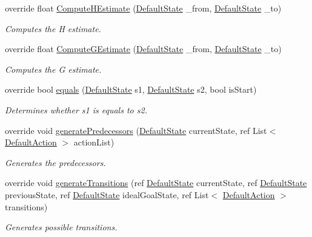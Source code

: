 \begin{DoxyCompactItemize}
\item 
override float \hyperlink{class_a_r_astar_domain_a94b2a2fb1766938d4da597ebf3fa16fd}{Compute\-H\-Estimate} (\hyperlink{class_default_state}{Default\-State} \-\_\-from, \hyperlink{class_default_state}{Default\-State} \-\_\-to)
\begin{DoxyCompactList}\small\item\em Computes the H estimate. \end{DoxyCompactList}\item 
override float \hyperlink{class_a_r_astar_domain_ae5d72a77811f6c7ec9eb48e2c4d895f0}{Compute\-G\-Estimate} (\hyperlink{class_default_state}{Default\-State} \-\_\-from, \hyperlink{class_default_state}{Default\-State} \-\_\-to)
\begin{DoxyCompactList}\small\item\em Computes the G estimate. \end{DoxyCompactList}\item 
override bool \hyperlink{class_a_r_astar_domain_a3da7327f8e5bf0594ba9ddb5c183475c}{equals} (\hyperlink{class_default_state}{Default\-State} s1, \hyperlink{class_default_state}{Default\-State} s2, bool is\-Start)
\begin{DoxyCompactList}\small\item\em Determines whether s1 is equals to s2. \end{DoxyCompactList}\item 
override void \hyperlink{class_a_r_astar_domain_a9d17ca7a84828a5af57ae2d8df034354}{generate\-Predecessors} (\hyperlink{class_default_state}{Default\-State} current\-State, ref List$<$ \hyperlink{class_default_action}{Default\-Action} $>$ action\-List)
\begin{DoxyCompactList}\small\item\em Generates the predecessors. \end{DoxyCompactList}\item 
override void \hyperlink{class_a_r_astar_domain_a16890b0a0fea5a007b3ad3264c39dd91}{generate\-Transitions} (ref \hyperlink{class_default_state}{Default\-State} current\-State, ref \hyperlink{class_default_state}{Default\-State} previous\-State, ref \hyperlink{class_default_state}{Default\-State} ideal\-Goal\-State, ref List$<$ \hyperlink{class_default_action}{Default\-Action} $>$ transitions)
\begin{DoxyCompactList}\small\item\em Generates possible transitions. \end{DoxyCompactList}\end{DoxyCompactItemize}
